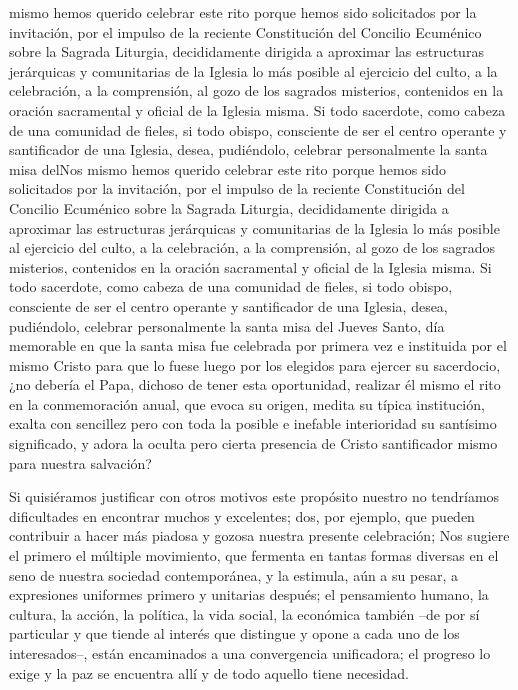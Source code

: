 \begin{body}
 mismo hemos querido celebrar este rito  porque hemos sido solicitados por la invitación, por el impulso de la reciente Constitución del Concilio Ecuménico sobre la Sagrada Liturgia, decididamente dirigida a aproximar las estructuras jerárquicas y comunitarias de la Iglesia lo más posible al ejercicio del culto, a la celebración, a la comprensión, al gozo de los sagrados misterios, contenidos en la oración sacramental y oficial de la Iglesia misma. Si todo sacerdote, como cabeza de una comunidad de fieles, si todo obispo, consciente de ser el centro operante y santificador de una Iglesia, desea, pudiéndolo, celebrar personalmente la santa misa delNos mismo hemos querido celebrar este rito  porque hemos sido solicitados por la invitación, por el impulso de la reciente Constitución del Concilio Ecuménico sobre la Sagrada Liturgia, decididamente dirigida a aproximar las estructuras jerárquicas y comunitarias de la Iglesia lo más posible al ejercicio del culto, a la celebración, a la comprensión, al gozo de los sagrados misterios, contenidos en la oración sacramental y oficial de la Iglesia misma. Si todo sacerdote, como cabeza de una comunidad de fieles, si todo obispo, consciente de ser el centro operante y santificador de una Iglesia, desea, pudiéndolo, celebrar personalmente la santa misa del Jueves Santo, día memorable en que la santa misa fue celebrada por primera vez e instituida por el mismo Cristo para que lo fuese luego por los elegidos para ejercer su sacerdocio, ¿no debería el Papa, dichoso de tener esta oportunidad, realizar él mismo el rito en la conmemoración anual, que evoca su origen, medita su típica institución, exalta con sencillez pero con toda la posible e inefable interioridad su santísimo significado, y adora la oculta pero cierta presencia de Cristo santificador mismo para nuestra salvación?

Si quisiéramos justificar con otros motivos este propósito nuestro no tendríamos dificultades en encontrar muchos y excelentes; dos, por ejemplo, que pueden contribuir a hacer más piadosa y gozosa nuestra presente celebración; Nos sugiere el primero el múltiple movimiento, que fermenta en tantas formas diversas en el seno de nuestra sociedad contemporánea, y la estimula, aún a su pesar, a expresiones uniformes primero y unitarias después; el pensamiento humano, la cultura, la acción, la política, la vida social, la económica también –de por sí particular y que tiende al interés que distingue y opone a cada uno de los interesados–, están encaminados a una convergencia unificadora; el progreso lo exige y la paz se encuentra allí y de todo aquello tiene necesidad.


\end{body}
